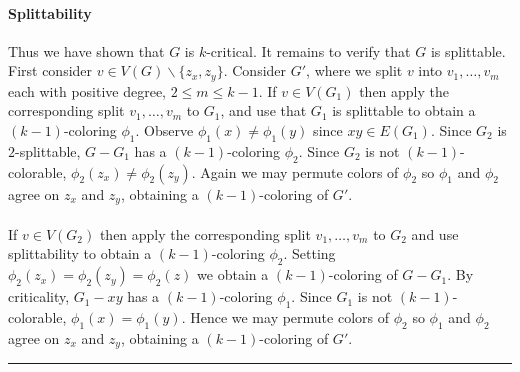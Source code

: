 \documentclass[letterpaper,12pt,oneside,onecolumn]{article}
\newenvironment{proof}{{\bf Proof:  }}{\hfill\rule{2mm}{2mm}}
\begin{document}
\begin{proof}
	\paragraph{Splittability}
	Thus we have shown that $G$ is $k$-critical. It remains to verify that $G$ is splittable. First consider $v \in V(G) \backslash\{z_x,z_y\}$. Consider $G'$, where we split $v$ into $v_1, \dots, v_m$ each with positive degree, $2 \leq m \leq k-1$. If $v \in V(G_1)$ then apply the corresponding split $v_1, \dots, v_m$ to $G_1$, and use that $G_1$ is splittable to obtain a $(k-1)$-coloring $\phi_1$. Observe $\phi_1(x) \neq \phi_1(y)$ since $xy \in E(G_1)$. Since $G_2$ is $2$-splittable, $G - G_1$ has a $(k-1)$-coloring $\phi_2$. Since $G_2$ is not $(k-1)$-colorable, $\phi_2(z_x) \neq \phi_2(z_y)$. Again we may permute colors of $\phi_2$ so $\phi_1$ and $\phi_2$ agree on $z_x$ and $z_y$, obtaining a $(k-1)$-coloring of $G'$.
	\paragraph{}
	If $v \in V(G_2)$ then apply the corresponding split $v_1, \dots, v_m$ to $G_2$ and use splittability to obtain a $(k-1)$-coloring $\phi_2$. Setting $\phi_2(z_x) = \phi_2(z_y) = \phi_2(z)$ we obtain a $(k-1)$-coloring of $G-G_1$. By criticality, $G_1-xy$ has a $(k-1)$-coloring $\phi_1$. Since $G_1$ is not $(k-1)$-colorable, $\phi_1(x) = \phi_1(y)$. Hence we may permute colors of $\phi_2$ so $\phi_1$ and $\phi_2$ agree on $z_x$ and $z_y$, obtaining a $(k-1)$-coloring of $G'$.

\end{proof}
\end{document}
